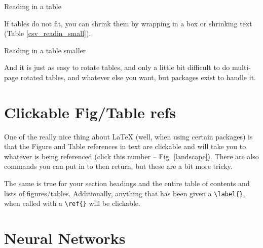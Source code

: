 \begin{table}[h]
\centering
\caption[Normal size table]{Reading in a table}
\label{csv_readin}
\end{table}

If tables do not fit, you can shrink them by wrapping in a box or shrinking text (Table \ref{csv_readin_small}).

\begin{table}[h]
\centering
\caption[Tiny table]{Reading in a table smaller}
\label{csv_readin_small}
\end{table}

And it is just as easy to rotate tables, and only a little bit difficult to do multi-page rotated tables, and whatever else you want, but packages exist to handle it. 

\clearpage %

\section{Clickable Fig/Table refs}

One of the really nice thing about \LaTeX{} (well, when using certain packages) is that the Figure and Table references in text are clickable and will take you to whatever is being referenced (click this number -- Fig. \ref{landscape}). There are also commands you can put in to then return, but these are a bit more tricky. 

The same is true for your section headings and the entire table of contents and lists of figures/tables. Additionally, anything that has been given a \verb+\label{}+, when called with a \verb+\ref{}+ will be clickable. 






\section{Neural Networks}



